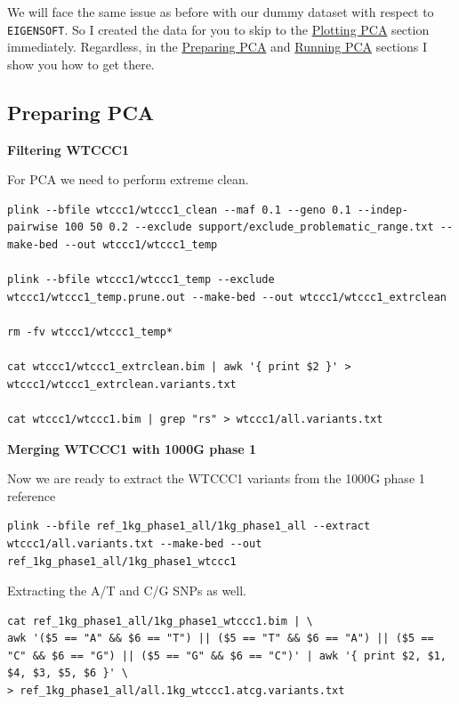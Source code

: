 \documentclass[
]{book}
\newcommand{\passthrough}[1]{#1}
\begin{document}
We will face the same issue as before with our dummy dataset with respect to \passthrough{\lstinline!EIGENSOFT!}. So I created the data for you to skip to the \protect\hyperlink{plotting-pca}{Plotting PCA} section immediately. Regardless, in the \protect\hyperlink{preparing-pca}{Preparing PCA} and \protect\hyperlink{running-pca}{Running PCA} sections I show you how to get there.

\hypertarget{preparing-pca}{%
\subsection{Preparing PCA}\label{preparing-pca}}

\textbf{Filtering WTCCC1}

For PCA we need to perform extreme clean.

\begin{lstlisting}
plink --bfile wtccc1/wtccc1_clean --maf 0.1 --geno 0.1 --indep-pairwise 100 50 0.2 --exclude support/exclude_problematic_range.txt --make-bed --out wtccc1/wtccc1_temp

plink --bfile wtccc1/wtccc1_temp --exclude wtccc1/wtccc1_temp.prune.out --make-bed --out wtccc1/wtccc1_extrclean

rm -fv wtccc1/wtccc1_temp*

cat wtccc1/wtccc1_extrclean.bim | awk '{ print $2 }' > wtccc1/wtccc1_extrclean.variants.txt

cat wtccc1/wtccc1.bim | grep "rs" > wtccc1/all.variants.txt
\end{lstlisting}

\textbf{Merging WTCCC1 with 1000G phase 1}

Now we are ready to extract the WTCCC1 variants from the 1000G phase 1 reference

\begin{lstlisting}
plink --bfile ref_1kg_phase1_all/1kg_phase1_all --extract wtccc1/all.variants.txt --make-bed --out ref_1kg_phase1_all/1kg_phase1_wtccc1
\end{lstlisting}

Extracting the A/T and C/G SNPs as well.

\begin{lstlisting}
cat ref_1kg_phase1_all/1kg_phase1_wtccc1.bim | \
awk '($5 == "A" && $6 == "T") || ($5 == "T" && $6 == "A") || ($5 == "C" && $6 == "G") || ($5 == "G" && $6 == "C")' | awk '{ print $2, $1, $4, $3, $5, $6 }' \
> ref_1kg_phase1_all/all.1kg_wtccc1.atcg.variants.txt
\end{lstlisting}
\end{document}

